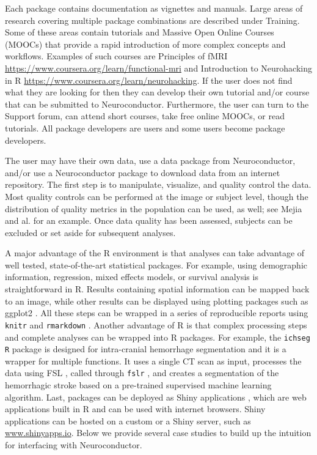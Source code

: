 \documentclass[]{elsarticle} %
\begin{document}
Each package contains documentation as vignettes and manuals. Large areas of research covering multiple package combinations are described under Training. Some of these areas contain tutorials and Massive  Open Online Courses (MOOCs) that provide a rapid introduction of more complex concepts and workflows. Examples of such courses are Principles of fMRI  \url{https://www.coursera.org/learn/functional-mri} and Introduction to Neurohacking in R \url{https://www.coursera.org/learn/neurohacking}.  If the user does not find what they are looking for then they can develop their own tutorial and/or course that can be submitted to Neuroconductor. Furthermore, the user can turn to the Support forum,  can attend short courses, take free online MOOCs, or read tutorials. All package developers are users and some users become package developers.

The user may have their own data, use a data package from Neuroconductor, and/or use a Neuroconductor package  to download data from an internet repository.  The first step is to manipulate, visualize, and quality control the data.  Most quality controls can be performed at the image or subject level, though the distribution of quality metrics in the population can be used, as well; see Mejia and al. \citep{mejia2015pca} for an example. Once data quality has been assessed, subjects can be excluded or set aside for subsequent analyses.   

A major advantage of the R environment is that analyses can take advantage of well tested,  state-of-the-art statistical packages. For example, using demographic information,  regression, mixed effects models, or survival analysis is straightforward in R.  Results containing spatial information can be mapped back to an image, while other results can be displayed using plotting packages such as ggplot2 \citep{ggplot2}.  All these steps can be wrapped in a series of reproducible reports using \verb"knitr" and \verb"rmarkdown" \citep{rmarkdown,knitr}. Another advantage of R is that complex processing steps and complete analyses can be wrapped into R packages. For example, the \verb"ichseg" \cite{ichseg,muschelli2016pitch} \verb"R" package is designed for intra-cranial hemorrhage segmentation and it is a wrapper for multiple functions. It uses a  single CT scan as input, processes the data using FSL \citep{fsl}, called through \texttt{fslr} \citep{fslr}, and creates a segmentation of the hemorrhagic stroke based on a pre-trained supervised machine learning algorithm. Last, packages can be deployed as Shiny applications \citep{shiny}, which are web applications built in R and can be used with internet browsers.  Shiny applications can be hosted on a custom or a Shiny server, such as \url{www.shinyapps.io}. Below we provide several case studies to build up the intuition for interfacing with  Neuroconductor.
\end{document}
